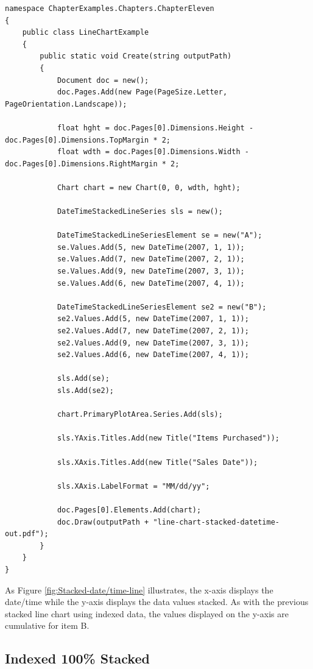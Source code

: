 \documentclass[american]{tufte-book}
\numberwithin{equation}{section}
\numberwithin{figure}{section}
\begin{document}
{\begin{lstlisting}[caption={Stacked date/time line chart.},label={lis:Stacked-date/time-line},basicstyle={\footnotesize\ttfamily},breaklines=true]
namespace ChapterExamples.Chapters.ChapterEleven
{
    public class LineChartExample
    {
        public static void Create(string outputPath)
        {
            Document doc = new();
            doc.Pages.Add(new Page(PageSize.Letter, PageOrientation.Landscape));

            float hght = doc.Pages[0].Dimensions.Height - doc.Pages[0].Dimensions.TopMargin * 2;
            float wdth = doc.Pages[0].Dimensions.Width - doc.Pages[0].Dimensions.RightMargin * 2;

            Chart chart = new Chart(0, 0, wdth, hght);
           
            DateTimeStackedLineSeries sls = new();

            DateTimeStackedLineSeriesElement se = new("A");
            se.Values.Add(5, new DateTime(2007, 1, 1));
            se.Values.Add(7, new DateTime(2007, 2, 1));
            se.Values.Add(9, new DateTime(2007, 3, 1));
            se.Values.Add(6, new DateTime(2007, 4, 1));

            DateTimeStackedLineSeriesElement se2 = new("B");
            se2.Values.Add(5, new DateTime(2007, 1, 1));
            se2.Values.Add(7, new DateTime(2007, 2, 1));
            se2.Values.Add(9, new DateTime(2007, 3, 1));
            se2.Values.Add(6, new DateTime(2007, 4, 1));
            
            sls.Add(se);
            sls.Add(se2);

            chart.PrimaryPlotArea.Series.Add(sls);

            sls.YAxis.Titles.Add(new Title("Items Purchased"));

            sls.XAxis.Titles.Add(new Title("Sales Date"));

            sls.XAxis.LabelFormat = "MM/dd/yy";

            doc.Pages[0].Elements.Add(chart);
            doc.Draw(outputPath + "line-chart-stacked-datetime-out.pdf");
        }
    }
}
\end{lstlisting}
\leavevmode\egroup
As Figure \ref{fig:Stacked-date/time-line} illustrates, the x-axis
displays the date/time while the y-axis displays the data values stacked.
As with the previous stacked line chart using indexed data, the values
displayed on the y-axis are cumulative for item B.

\subsection*{Indexed 100\% Stacked}

}
\end{document}
